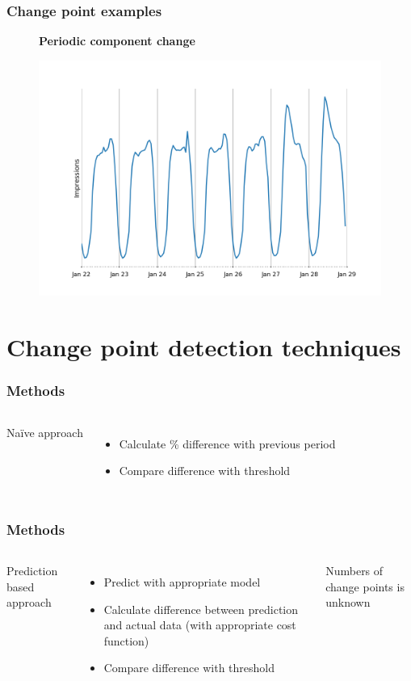 \documentclass[intlimits, 9pt, unicode]{beamer}
\begin{document}
\begin{frame}
\frametitle{Change point examples}
\begin{figure}
\textbf{Periodic component change}\par\medskip
\includegraphics[scale=0.30]{images/006_structure}
\end{figure}
\end{frame}


\section{Change point detection techniques}


\begin{frame}
    \frametitle{Methods}

  \begin{columns}[T,onlytextwidth]
      Naïve approach 
    \begin{itemize}
    	\item Calculate \% difference with previous period
	\item Compare difference with threshold
    \end{itemize}

     \end{columns}

\end{frame}


\begin{frame}
    \frametitle{Methods}

  \begin{columns}[T,onlytextwidth]
	Prediction based approach
	    \begin{itemize}
	    	\item Predict with appropriate model
		\item Calculate difference between prediction and actual data (with appropriate cost function)
		\item Compare difference with threshold
	    \end{itemize}
	Numbers of change points is unknown

     \end{columns}

\end{frame}
\end{document}
